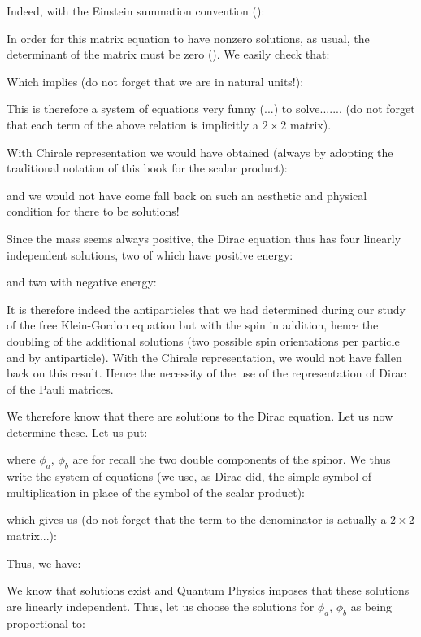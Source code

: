 	Indeed, with the Einstein summation convention ():
	
	In order for this matrix equation to have nonzero solutions, as usual, the determinant of the matrix must be zero (). We easily check that:
	
	Which implies (do not forget that we are in natural units!):
	
	This is therefore a system of equations very funny (...) to solve....... (do not forget that each term of the above relation is implicitly a $2\times 2$ matrix).
	
	With Chirale representation we would have obtained (always by adopting the traditional notation of this book for the scalar product):
	
	and we would not have come fall back on such an aesthetic and physical condition for there to be solutions!

Since the mass seems always positive, the Dirac equation thus has four linearly independent solutions, two of which have positive energy:
	
	and two with negative energy:
	
	It is therefore indeed the antiparticles that we had determined during our study of the free Klein-Gordon equation but with the spin in addition, hence the doubling of the additional solutions (two possible spin orientations per particle and by antiparticle). With the Chirale representation, we would not have fallen back on this result. Hence the necessity of the use of the representation of Dirac of the Pauli matrices.

We therefore know that there are solutions to the Dirac equation. Let us now determine these. Let us put:
	
	where $\phi_a$, $\phi_b$ are for recall the two double components of the spinor. We thus write the system of equations (we use, as Dirac did, the simple symbol of multiplication in place of the symbol of the scalar product):
	
	which gives us (do not forget that the term to the denominator is actually a $2\times 2$ matrix...):
	
	Thus, we have:
	
	We know that solutions exist and Quantum Physics imposes that these solutions are linearly independent. Thus, let us choose the solutions for $\phi_a$, $\phi_b$ as being proportional to:
	

